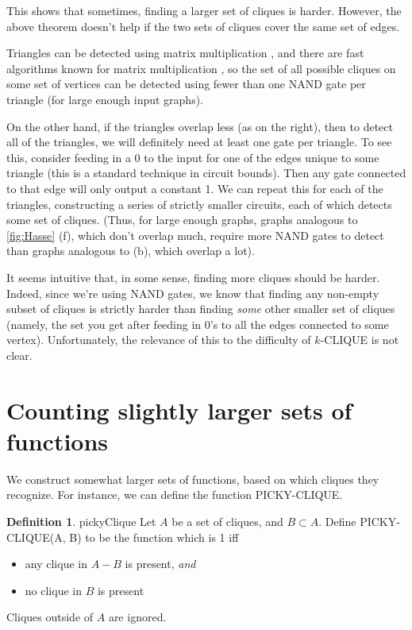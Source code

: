 \documentclass[12pt]{article}
\theoremstyle{definition}
\newtheorem{defn}{Definition}[section]
\begin{document}
This shows that sometimes, finding a larger set of cliques is
harder. However, the above theorem doesn't help if the two
sets of cliques cover the same set of edges.

Triangles can be detected using matrix multiplication \cite{itai_finding_1977},
and there are fast algorithms known for matrix multiplication
\cite{strassen_gaussian_1969}
\cite{williams_multiplying_2012}, so the set of all possible
cliques on some set of vertices
 can be detected
using fewer than one NAND gate per triangle (for large enough input graphs).

On the other hand, if the triangles overlap less (as on the right),
then to detect all of the triangles, we will definitely need at least one
gate per triangle.
To see this, consider feeding in a 0 to the input for one
of the edges unique to some triangle (this is a
standard technique in circuit bounds).
Then any gate connected to
that edge will only output a constant 1. We can repeat this for each of the
triangles, constructing a series of strictly smaller circuits, each of which 
detects some set of cliques. (Thus, for large enough graphs,
graphs analogous to \ref{fig:Hasse} (f), which don't overlap much,
require more NAND gates to detect than graphs 
analogous to (b), which overlap
a lot).

It seems intuitive that, in some sense, finding more cliques should
be harder.
Indeed, since we're using NAND gates, we know that finding any non-empty
subset of cliques is strictly harder than finding {\em some} other 
smaller set of cliques (namely, the set you get after feeding in 0's to
all the edges connected to some vertex).
Unfortunately, the relevance of this to the difficulty
of $k$-CLIQUE is not clear.

\section{Counting slightly larger sets of functions}

We construct somewhat larger sets of functions, based on
which cliques they recognize. For instance, we can define the
function PICKY-CLIQUE.

\begin{defn}{pickyClique}
Let $A$ be a set of cliques, and $B \subset A$.
Define PICKY-CLIQUE(A, B) to be the function which is 1 iff

\begin{itemize}

\item any clique in $A-B$ is present, {\em and}

\item no clique in $B$ is present

\end{itemize}
Cliques outside of $A$ are ignored.

\end{defn}
\end{document}
